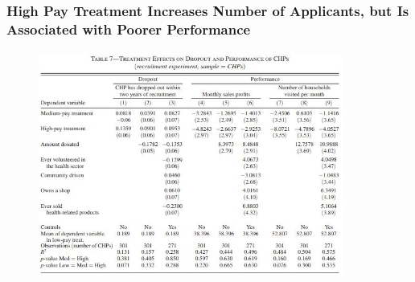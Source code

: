 \documentclass{beamer}
\begin{document}
\begin{frame}
\frametitle{High Pay Treatment Increases Number of Applicants, but Is Associated with Poorer Performance}
\begin{figure}
    \includegraphics[width=10cm,height=7.5cm]{Deserranno_Table7} 
     \end{figure}



\end{frame}
\end{document}
